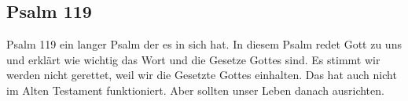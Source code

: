 \subsection{Psalm 119}
Psalm 119 ein langer Psalm der es in sich hat. In diesem Psalm redet Gott zu uns und erklärt wie wichtig das Wort und die Gesetze Gottes sind. Es stimmt wir werden nicht gerettet, weil wir die Gesetzte Gottes einhalten. Das hat auch nicht im Alten Testament funktioniert. Aber sollten unser Leben danach ausrichten. 